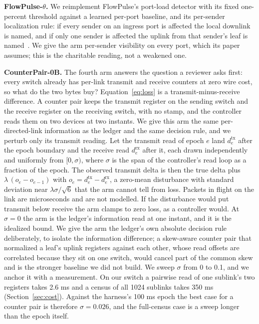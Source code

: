 \textbf{FlowPulse-$\theta$.} We reimplement FlowPulse's port-load detector with its fixed one-percent threshold against a learned per-port baseline, and its per-sender localization rule: if every sender on an ingress port is affected the local downlink is named, and if only one sender is affected the uplink from that sender's leaf is named~\cite{flowpulse}. We give the arm per-sender visibility on every port, which its paper assumes; this is the charitable reading, not a weakened one.

\textbf{CounterPair-0B.} The fourth arm answers the question a reviewer asks first: every switch already has per-link transmit and receive counters at zero wire cost, so what do the two bytes buy? Equation~\eqref{eq:loss} is a transmit-minus-receive difference. A counter pair keeps the transmit register on the sending switch and the receive register on the receiving switch, with no stamp, and the controller reads them on two devices at two instants. We give this arm the same per-directed-link information as the ledger and the same decision rule, and we perturb only its transmit reading. Let the transmit read of epoch $e$ land $d_e^{\mathrm{tx}}$ after the epoch boundary and the receive read $d_e^{\mathrm{rx}}$ after it, each drawn independently and uniformly from $[0,\sigma)$, where $\sigma$ is the span of the controller's read loop as a fraction of the epoch. The observed transmit delta is then the true delta plus $\lambda\,(o_e - o_{e-1})$ with $o_e = d_e^{\mathrm{tx}} - d_e^{\mathrm{rx}}$, a zero-mean disturbance with standard deviation near $\lambda\sigma/\sqrt{6}$ that the arm cannot tell from loss. Packets in flight on the link are microseconds and are not modelled. If the disturbance would put transmit below receive the arm clamps to zero loss, as a controller would. At $\sigma=0$ the arm is the ledger's information read at one instant, and it is the idealized bound. We give the arm the ledger's own absolute decision rule deliberately, to isolate the information difference; a skew-aware counter pair that normalized a leaf's uplink registers against each other, whose read offsets are correlated because they sit on one switch, would cancel part of the common skew and is the stronger baseline we did not build. We sweep $\sigma$ from 0 to 0.1, and we anchor it with a measurement. On our switch a pairwise read of one sublink's two registers takes 2.6 ms and a census of all 1024 sublinks takes 350 ms (Section~\ref{sec:cost}). Against the harness's 100 ms epoch the best case for a counter pair is therefore $\sigma = 0.026$, and the full-census case is a sweep longer than the epoch itself.

